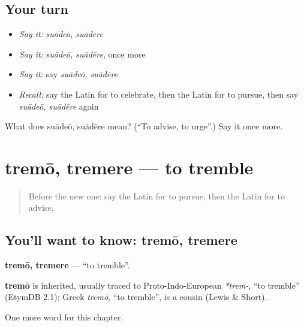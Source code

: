 \subsection*{Your turn}
\begin{itemize}
\raggedright
  \item \emph{Say it:} \emph{suādeō, suādēre}
  \item \emph{Say it:} \emph{suādeō, suādēre}, once more
  \item \emph{Say it:} say \emph{suādeō, suādēre}
  \item \emph{Recall:} say the Latin for to celebrate, then the Latin for to pursue, then say \emph{suādeō, suādēre} again
\end{itemize}

\begin{tcolorbox}[breakable,colback=teal!4,colframe=teal!35!black,title={Before you move on}]
What does suādeō, suādēre mean? (\textquotedblleft{}To advise, to urge\textquotedblright{}.) Say it once more.
\end{tcolorbox}
\section[tremō, tremere]{tremō, tremere — to tremble}

\label{lesson:LA-C202-tremo}



\begin{quote}
Before the new one: say the Latin for to pursue, then the Latin for to advise.
\end{quote}

\subsection*{You'll want to know: tremō, tremere}
\textbf{tremō, tremere} — \textquotedblleft{}to tremble\textquotedblright{}.

\begin{cousinweb}
\textbf{tremō} is inherited, usually traced to Proto-Indo-European \emph{*trem-}, \textquotedblleft{}to tremble\textquotedblright{} (EtymDB 2.1); Greek \emph{tremō}, \textquotedblleft{}to tremble\textquotedblright{}, is a cousin (Lewis \& Short).
\end{cousinweb}

\begin{grammarlens}[title={What you've built}]
One more word for this chapter.
\end{grammarlens}

